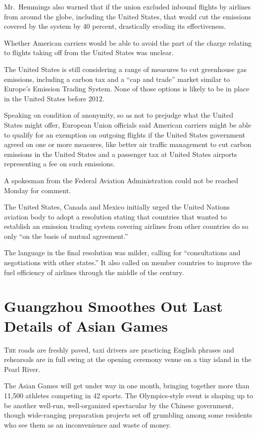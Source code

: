 ﻿\documentclass[12pt]{article}
\begin{document}
Mr.~Hemmings also warned that if the union excluded inbound flights by airlines from around the
globe, including the United States, that would cut the emissions covered by the system by 40
percent, drastically eroding its effectiveness.

Whether American carriers would be able to avoid the part of the charge relating to flights taking
off from the United States was unclear.

The United States is still considering a range of measures to cut greenhouse gas emissions,
including a carbon tax and a ``cap and trade'' market similar to Europe's Emission Trading System.
None of those options is likely to be in place in the United States before 2012.

Speaking on condition of anonymity, so as not to prejudge what the United States might offer,
European Union officials said American carriers might be able to qualify for an exemption on
outgoing flights if the United States government agreed on one or more measures, like better air
traffic management to cut carbon emissions in the United States and a passenger tax at United States
airports representing a fee on such emissions.

A spokesman from the Federal Aviation Administration could not be reached Monday for comment.

The United States, Canada and Mexico initially urged the United Nations aviation body to adopt a
resolution stating that countries that wanted to establish an emission trading system covering
airlines from other countries do so only ``on the basis of mutual agreement.''

The language in the final resolution was milder, calling for ``consultations and negotiations with
other states.'' It also called on member countries to improve the fuel efficiency of airlines
through the middle of the century.

\section{Guangzhou Smoothes Out Last Details of Asian Games}

\lettrine{T}{he} roads are freshly paved, taxi drivers are practicing
English phrases and rehearsals are in full swing at the opening ceremony venue on a tiny island in
the Pearl River.

The Asian Games will get under way in one month, bringing together more than 11,500 athletes
competing in 42 sports. The Olympics-style event is shaping up to be another well-run,
well-organized spectacular by the Chinese government, though wide-ranging preparation projects set
off grumbling among some residents who see them as an inconvenience and waste of money.
\end{document}
